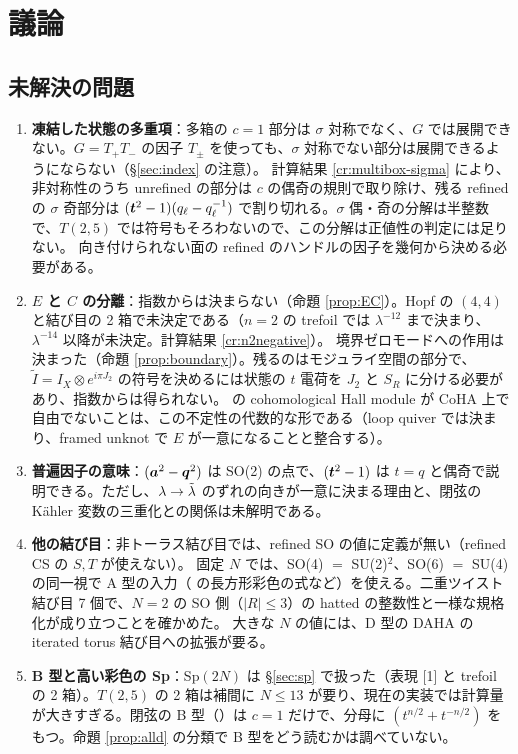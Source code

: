 \section{議論}\label{sec:discussion}

\subsection{未解決の問題}
\begin{enumerate}
\item \textbf{凍結した状態の多重項}：多箱の $c = 1$ 部分は $\sigma$ 対称でなく、$G$ では展開できない。$G = T_+T_-$ の因子 $T_\pm$ を使っても、$\sigma$ 対称でない部分は展開できるようにならない（§\ref{sec:index} の注意）。
計算結果 \ref{cr:multibox-sigma} により、非対称性のうち unrefined の部分は $c$ の偶奇の規則で取り除け、残る refined の $\sigma$ 奇部分は $(\bm{t}^2-1)(q_\ell - q_\ell^{-1})$ で割り切れる。$\sigma$ 偶・奇の分解は半整数で、$T(2,5)$ では符号もそろわないので、この分解は正値性の判定には足りない。
向き付けられない面の refined のハンドルの因子を幾何から決める必要がある。
\item \textbf{$E$ と $C$ の分離}：指数からは決まらない（命題 \ref{prop:EC}）。Hopf の $(4,4)$ と結び目の 2 箱で未決定である（$n = 2$ の trefoil では $\lambda^{-12}$ まで決まり、$\lambda^{-14}$ 以降が未決定。計算結果 \ref{cr:n2negative}）。
境界ゼロモードへの作用は決まった（命題 \ref{prop:boundary}）。残るのはモジュライ空間の部分で、$\tilde I = I_X\otimes e^{i\pi J_2}$ の符号を決めるには状態の $t$ 電荷を $J_2$ と $S_R$ に分ける必要があり、指数からは得られない。\cite{Young16} の cohomological Hall module が CoHA 上で自由でないことは、この不定性の代数的な形である（loop quiver では決まり、framed unknot で $E$ が一意になることと整合する）。
\item \textbf{普遍因子の意味}：$(\bm{a}^2 - \bm{q}^2)$ は SO(2) の点で、$(\bm{t}^2 - 1)$ は $t = q$ と偶奇で説明できる。ただし、$\lambda \to \tilde\lambda$ のずれの向きが一意に決まる理由と、閉弦の Kähler 変数の三重化との関係は未解明である。
\item \textbf{他の結び目}：非トーラス結び目では、refined SO の値に定義が無い（refined CS の $S, T$ が使えない）。
固定 $N$ では、SO(4) $=$ SU(2)$^2$、SO(6) $=$ SU(4) の同一視で A 型の入力（\cite{KNTZ19} の長方形彩色の式など）を使える。二重ツイスト結び目 7 個で、$N = 2$ の SO 側（$|R| \le 3$）の hatted の整数性と一様な規格化が成り立つことを確かめた。
大きな $N$ の値には、D 型の DAHA の iterated torus 結び目への拡張が要る。
\item \textbf{B 型と高い彩色の Sp}：Sp$(2N)$ は §\ref{sec:sp} で扱った（表現 [1] と trefoil の 2 箱）。$T(2,5)$ の 2 箱は補間に $N \le 13$ が要り、現在の実装では計算量が大きすぎる。閉弦の B 型（\cite{AM22}）は $c = 1$ だけで、分母に $(t^{n/2} + t^{-n/2})$ をもつ。命題 \ref{prop:alld} の分類で B 型をどう読むかは調べていない。

\end{enumerate}
